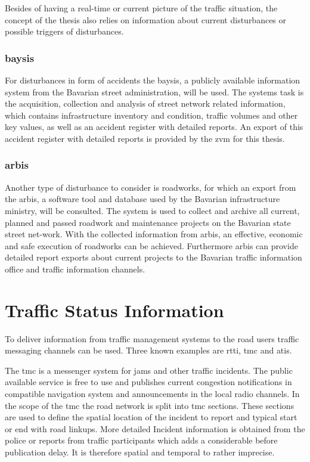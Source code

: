 Besides of having a real-time or current picture of the traffic situation, the concept of the thesis also relies on information about current disturbances or possible triggers of disturbances. 

\subsubsection{\acrfull{baysis}}
For disturbances in form of accidents the \acrfull{baysis}, a publicly available information system from the Bavarian street administration, will be used. The systems task is the acquisition, collection and analysis of street network related information, which contains infrastructure inventory and condition, traffic volumes and other key values, as well as an accident register with detailed reports. An export of this accident register with detailed reports is provided by the \acrfull{zvm} for this thesis.

\subsubsection{\acrfull{arbis}}
Another type of disturbance to consider is roadworks, for which an export from the \acrfull{arbis}, a software tool and database used by the Bavarian infrastructure ministry, will be consulted. The system is used to collect and archive all current, planned and passed roadwork and maintenance projects on the Bavarian state street net-work. With the collected information from \acrshort{arbis}, an effective, economic and safe execution of roadworks can be achieved. Furthermore \acrshort{arbis} can provide detailed report exports about current projects to the Bavarian traffic information office and traffic information channels. \parencite{trafficon2017}

\section{Traffic Status Information}

To deliver information from traffic management systems to the road users traffic messaging channels can be used. Three known examples are \acrfull{rtti}, \acrfull{tmc} and \acrfull{atis}.

The \acrshort{tmc} is a messenger system for jams and other traffic incidents. The public available service is free to use and publishes current congestion notifications in compatible navigation system and announcements in the local radio channels. In the scope of the \acrshort{tmc} the road network is split into \acrshort{tmc} sections. These sections are used to define the spatial location of the incident to report and typical start or end with road linkups. More detailed Incident information is obtained from the police or reports from traffic participants which adds a considerable before publication delay. It is therefore spatial and temporal to rather imprecise. \parencite{LAPID2020}

